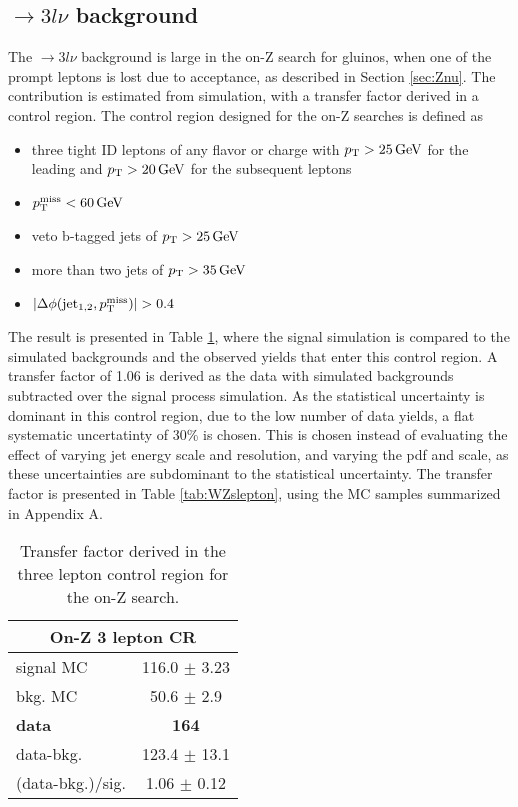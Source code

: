 \subsection*{\PWZ$\rightarrow3l\nu$ background}\label{sec:Znustrong}
\noindent\justify
The \PWZ$\rightarrow3l\nu$ background is large in the on-Z search for gluinos, when one of the prompt leptons is lost due to acceptance, as described in Section \ref{sec:Znu}. 
The contribution is estimated from simulation, with a transfer factor derived in a \PWZ control region. 
The \PWZ control region designed for the on-Z searches is defined as
\begin{itemize}
    \item three tight ID leptons of any flavor or charge with $p_{\mathrm{T}}>25\,\text{Ge\hspace{-.08em}V}$ for the leading and $p_{\mathrm{T}}>20\,\text{Ge\hspace{-.08em}V}$ for the subsequent leptons
    \item $p_{\mathrm{T}}^\text{miss}<60\,\text{Ge\hspace{-.08em}V}$
    \item veto b-tagged jets of $p_{\mathrm{T}}>25\,\text{Ge\hspace{-.08em}V}$
    \item more than two jets of $p_{\mathrm{T}}>35\,\text{Ge\hspace{-.08em}V}$
    \item $|\Delta\phi(\mathrm{jet_{1,2}}, \ptmiss)|>0.4$
\end{itemize}
The result is presented in Table \ref{tab:WZonZ}, where the \PWZ signal simulation is compared to the simulated backgrounds and the observed yields that enter this control region.
A transfer factor of 1.06 is derived as the data with simulated backgrounds subtracted over the signal process simulation.
As the statistical uncertainty is dominant in this control region, due to the low number of data yields, a flat systematic uncertatinty of 30\% is chosen.
This is chosen instead of evaluating the effect of varying jet energy scale and resolution, and varying the pdf and scale, as these uncertainties are subdominant to the statistical uncertainty.
The transfer factor is presented in Table \ref{tab:WZslepton}, using the MC samples summarized in Appendix A.
\begin{table}[ht!]
\def\arraystretch{1.2}
\setlength{\belowcaptionskip}{6pt}
\small
\centering
\caption{Transfer factor derived in the three lepton control region for the on-Z search.}
\label{tab:WZonZ}
\begin{tabular}{l c }
\hline \hline
\multicolumn{2}{c}{On-Z 3 lepton CR}  \\\hline
signal MC        & 116.0     $\pm$  3.23    \\
bkg. MC          & 50.6  $\pm$  2.9\\ \hline
\textbf{data}       & \textbf{164}  \\
data-bkg.        &  123.4   $\pm$  13.1 \\ \hline
(data-bkg.)/sig. & 1.06   $\pm$  0.12\\ \hline\hline
\end{tabular}
\end{table}

